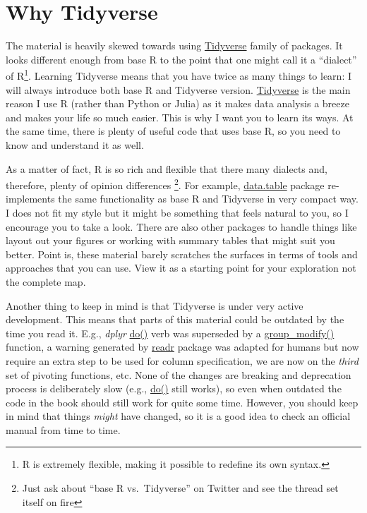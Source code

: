\documentclass[
]{book}
\begin{document}
\hypertarget{why-tidyverse}{%
\section*{Why Tidyverse}\label{why-tidyverse}}

The material is heavily skewed towards using \href{https://www.tidyverse.org/}{Tidyverse} family of packages. It looks different enough from base R to the point that one might call it a ``dialect'' of R\footnote{R is extremely flexible, making it possible to redefine its own syntax.}. Learning Tidyverse means that you have twice as many things to learn: I will always introduce both base R and Tidyverse version. \href{https://www.tidyverse.org/}{Tidyverse} is the main reason I use R (rather than Python or Julia) as it makes data analysis a breeze and makes your life so much easier. This is why I want you to learn its ways. At the same time, there is plenty of useful code that uses base R, so you need to know and understand it as well.

As a matter of fact, R is so rich and flexible that there many dialects and, therefore, plenty of opinion differences \footnote{Just ask about ``base R vs.~Tidyverse'' on Twitter and see the thread set itself on fire}. For example, \href{https://github.com/Rdatatable/data.table}{data.table} package re-implements the same functionality as base R and Tidyverse in very compact way. I does not fit my style but it might be something that feels natural to you, so I encourage you to take a look. There are also other packages to handle things like layout out your figures or working with summary tables that might suit you better. Point is, these material barely scratches the surfaces in terms of tools and approaches that you can use. View it as a starting point for your exploration not the complete map.

Another thing to keep in mind is that Tidyverse is under very active development. This means that parts of this material could be outdated by the time you read it. E.g., \emph{dplyr} \href{https://dplyr.tidyverse.org/reference/do.html}{do()} verb was superseded by a \href{https://dplyr.tidyverse.org/reference/group_map.html}{group\_modify()} function, a warning generated by \href{https://readr.tidyverse.org/}{readr} package was adapted for humans but now require an extra step to be used for column specification, we are now on the \emph{third} set of pivoting functions, etc. None of the changes are breaking and deprecation process is deliberately slow (e.g., \href{https://dplyr.tidyverse.org/reference/do.html}{do()} still works), so even when outdated the code in the book should still work for quite some time. However, you should keep in mind that things \emph{might} have changed, so it is a good idea to check an official manual from time to time.
\end{document}
